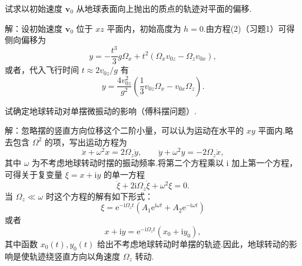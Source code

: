 \begin{xiti}
\quad 试求以初始速度 $\boldsymbol{v}_0$ 从地球表面向上抛出的质点的轨迹对平面的偏移.

解：设初始速度 $\boldsymbol{v}_0$ 位于 $xz$ 平面内，初始高度为 $h=0$.由方程(2)（习题1）可得侧向偏移为
\begin{equation*}
  y=-\frac{t^3}{3}g\Omega_x
  +t^2\left(\Omega_x v_{0z}-\Omega_z v_{0x}\right),
\end{equation*}
或者，代入飞行时间 $t\approx 2v_{0z}/g$ 有
\begin{equation*}
  y=\frac{4v_{0z}^2}{g^2}
  \left(\frac{1}{3}v_{0z}\Omega_x-v_{0x}\Omega_z\right).
\end{equation*}

\quad 试确定地球转动对单摆微振动的影响（傅科摆问题）.

解：忽略摆的竖直方向位移这个二阶小量，可以认为运动在水平的 $xy$ 平面内.略去包含 $\Omega^2$ 的项，写出运动方程为
\begin{equation*}
  \ddot{x}+\omega^2x=2\Omega_z\dot{y},\qquad
  \ddot{y}+\omega^2y=-2\Omega_z\dot{x},
\end{equation*}
其中 $\omega$ 为不考虑地球转动时摆的振动频率.将第二个方程乘以 $\mathrm{i}$ 加上第一个方程，可得关于复变量 $\xi=x+\mathrm{i}y$ 的单一方程
\begin{equation*}
  \ddot{\xi}+2\mathrm{i}\Omega_z\dot{\xi}+\omega^2\xi=0.
\end{equation*}
当 $\Omega_z\ll\omega$ 时这个方程的解有如下形式：
\begin{equation*}
  \xi=\mathrm{e}^{-\mathrm{i}\Omega_z t}
  \left(A_1\mathrm{e}^{\mathrm{i}\omega t}
  +A_2\mathrm{e}^{-\mathrm{i}\omega t}\right)
\end{equation*}
或者
\begin{equation*}
  x+\mathrm{i}y=\mathrm{e}^{-\mathrm{i}\Omega_z t}
  \left(x_0+\mathrm{i}y_0\right),
\end{equation*}
其中函数 $x_0(t),y_0(t)$ 给出不考虑地球转动时单摆的轨迹.因此，地球转动的影响是使轨迹绕竖直方向以角速度 $\Omega_z$ 转动.

\end{xiti}
